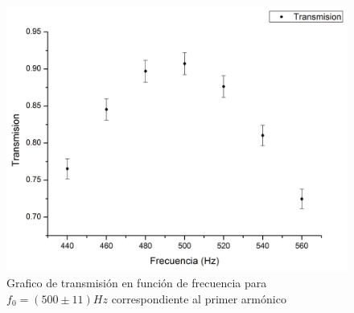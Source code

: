 \documentclass[11pt,a4paper]{article}
\begin{document}
\begin{figure}[h]
\centering
\includegraphics[scale=0.4]{Trans_vs_Frec_Cuad1}
\caption{Grafico de transmisión en función de frecuencia para $f_0 = (500 \pm 11)Hz$ correspondiente al primer armónico}
\label{fig:armonico1cuad}
\end{figure}
\end{document}
